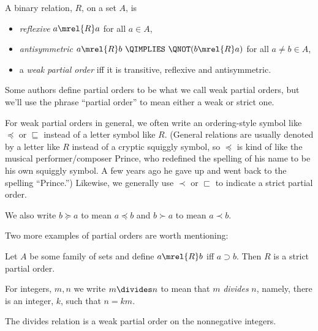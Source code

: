 \begin{definition}
A binary relation, $R$, on a set $A$, is
\begin{itemize}

\item \emph{reflexive} \qiff $a \mrel{R}  a$ \quad for all $a \in A$,

\item \emph{antisymmetric}\label{antis} \qiff
$a \mrel{R}  b\ \QIMPLIES\ \QNOT(b \mrel{R}  a)$
\quad for all $a \neq b \in A$,

\item a \emph{weak partial order} iff it is transitive, reflexive and
antisymmetric.

\end{itemize}
\end{definition}
%
Some authors define partial orders to be what we call weak partial orders,
but we'll use the phrase ``partial order'' to mean either a weak or strict
one.

For weak partial orders in general, we often write an ordering-style
symbol like $\preceq$ or $\sqsubseteq$ instead of a letter symbol like
$R$.  (General relations are usually denoted by a letter like $R$ instead
of a cryptic squiggly symbol, so $\preceq$ is kind of like the musical
performer/composer Prince, who redefined the spelling of his name to be
his own squiggly symbol.  A few years ago he gave up and went back to the
spelling ``Prince.'')  Likewise, we generally use $\prec$ or $\sqsubset$ to
indicate a strict partial order.

\begin{staffnotes}

We also write $b \succeq a$ to
mean $a \preceq b$ and $b \succ a$ to mean $a \prec b$.

\end{staffnotes}

Two more examples of partial orders are worth mentioning:

\begin{example}\label{supset}
Let $A$ be some family of sets and define $a \mrel{R} b$ iff $a
\supset b$.  Then $R$ is a strict partial order.
\end{example}

For integers, $m,n$ we write $m \divides n$ to mean that $m$
\emph{divides} $n$, namely, there is an integer, $k$, such that $n=km$.

\begin{example}\label{divides}
The divides relation is a weak partial order on the nonnegative integers.
\end{example}

